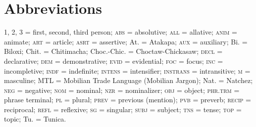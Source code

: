 \documentclass[output=paper]{LSP/langsci}
\begin{document}
\section* {Abbreviations}
 \textsc{1, 2, 3} = first, second, third person; \textsc{abs} = absolutive; \textsc{all} = allative; \textsc{anim} = animate; \textsc{art} = article; \textsc{asrt} = assertive; At. = Atakapa; \textsc{aux} = auxiliary; Bi. = Biloxi; Chit. = Chitimacha; Choc.-Chic. = Choctaw-Chickasaw; \textsc{decl} = declarative; \textsc{dem} = demonstrative; \textsc{evid} = evidential; \textsc{foc} = focus; \textsc{inc} = incompletive; \textsc{indf} = indefinite;  \textsc{intens} = intensifier; \textsc{instrans} = intransitive; \textsc{m} = masculine; MTL = Mobilian Trade Language (Mobilian Jargon); Nat. = Natchez; \textsc{neg} = negative; \textsc{nom} = nominal; \textsc{nzr} = nominalizer; \textsc{obj} = object; \textsc{phr.trm} = phrase terminal; \textsc{pl} = plural; \textsc{prev} = previous (mention); \textsc{pvb} = preverb; \textsc{recip} = reciprocal; \textsc{refl} = reflexive; \textsc{sg} = singular; \textsc{subj} = subject; \textsc{tns} = tense;  \textsc{top} = topic; Tu. = Tunica.

\printbibliography[heading=subbibliography,notkeyword=this]
\end{document}
